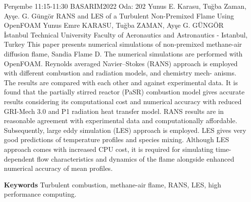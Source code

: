 
    \begin{abstract_basarim}
    {Perşembe 11:15-11:30}
    {BASARIM2022}
    {Oda: 202}
    {Yunus E. Karasu, Tuğba Zaman, Ayşe. G. Güngör}
    {RANS and LES of a Turbulent Non-Premixed Flame Using OpenFOAM}
    {%
    Yunus Emre KARASU, Tuğba ZAMAN, Ayşe G. GÜNGÖR}
    {%
    }
    {%
    İstanbul Technical University Faculty of Aeronautics and Astronautics - Istanbul, Turkey}
    This paper presents numerical simulations of non-premixed methane-air diffusion flame, Sandia Flame D. The numerical simulations are performed with OpenFOAM. Reynolds averaged Navier–Stokes (RANS) approach is employed with different combustion and radiation models, and chemistry mech- anisms. The results are compared with each other and against experimental data. It is found that the partially stirred reactor (PaSR) combustion model gives accurate results considering its computational cost and numerical accuracy with reduced GRI-Mech 3.0 and P1 radiation heat transfer model. RANS results are in reasonable agreement with experimental data and computationally affordable. Subsequently, large eddy simulation (LES) approach is employed. LES gives very good predictions of temperature profiles and species mixing. Although LES approach comes with increased CPU cost, it is required for simulating time-dependent flow characteristics and dynamics of the flame alongside enhanced numerical accuracy of mean profiles. 
    
        \textbf{Keywords} \newline{}Turbulent combustion, methane-air flame, RANS, LES, high performance computing.
    \end{abstract_basarim}
    